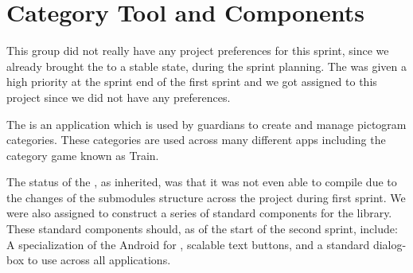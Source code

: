 \section{Category Tool and Components}

This group did not really have any project preferences for this sprint, since we already brought the \launcher to a stable state, during the sprint planning. The \giraf \ct was given a high priority at the sprint end of the first sprint and we got assigned to this project since we did not have any preferences. 

The \giraf \ct is an application which is used by guardians to create and manage pictogram categories. These categories are used across many different apps including the category game known as Train.

The status of the \ct, as inherited, was that it was not even able to compile due to the changes of the submodules structure across the project during first sprint. We were also assigned to construct a series of standard components for the  library. These standard components should, as of the start of the second sprint, include: A specialization of the Android  for \giraf, scalable text buttons, and a standard dialog-box to use across all applications. 
